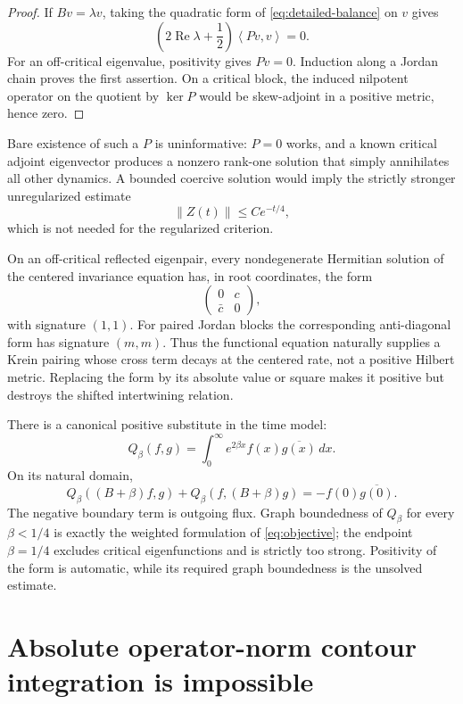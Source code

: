 \documentclass[11pt]{amsart}
\theoremstyle{definition}
\theoremstyle{remark}
\DeclareMathOperator{\Repart}{Re}
\newcommand{\ip}[2]{\left\langle #1,#2\right\rangle}
\newcommand{\norm}[1]{\left\lVert #1\right\rVert}
\begin{document}
\begin{proof}
If $Bv=\lambda v$, taking the quadratic form of
\eqref{eq:detailed-balance} on $v$ gives
\[
 \left(2\Repart\lambda+\frac12\right)\ip{Pv}{v}=0.
\]
For an off-critical eigenvalue, positivity gives $Pv=0$.  Induction along a
Jordan chain proves the first assertion.  On a critical block, the induced
nilpotent operator on the quotient by $\ker P$ would be skew-adjoint in a
positive metric, hence zero.
\end{proof}

Bare existence of such a $P$ is uninformative: $P=0$ works, and a known
critical adjoint eigenvector produces a nonzero rank-one solution that simply
annihilates all other dynamics.  A bounded coercive solution would imply the
strictly stronger unregularized estimate
\[
 \norm{Z(t)}\leq C e^{-t/4},
\]
which is not needed for the regularized criterion.

On an off-critical reflected eigenpair, every nondegenerate Hermitian solution
of the centered invariance equation has, in root coordinates, the form
\begin{equation}\label{eq:Krein-pair}
 \begin{pmatrix}0&c\\ \bar c&0\end{pmatrix},
\end{equation}
with signature $(1,1)$.  For paired Jordan blocks the corresponding
anti-diagonal form has signature $(m,m)$.  Thus the functional equation
naturally supplies a Krein pairing whose cross term decays at the centered
rate, not a positive Hilbert metric.  Replacing the form by its absolute value
or square makes it positive but destroys the shifted intertwining relation.

There is a canonical positive substitute in the time model:
\[
 Q_\beta(f,g)=\int_0^\infty e^{2\beta x}f(x)\overline{g(x)}\,dx.
\]
On its natural domain,
\begin{equation}\label{eq:positive-flux-form}
 Q_\beta((B+\beta)f,g)+Q_\beta(f,(B+\beta)g)
 =-f(0)\overline{g(0)}.
\end{equation}
The negative boundary term is outgoing flux.  Graph boundedness of $Q_\beta$
for every $\beta<1/4$ is exactly the weighted formulation of
\eqref{eq:objective}; the endpoint $\beta=1/4$ excludes critical
eigenfunctions and is strictly too strong.  Positivity of the form is
automatic, while its required graph boundedness is the unsolved estimate.

\section{Absolute operator-norm contour integration is impossible}
\label{sec:L1-divergence}
\end{document}
